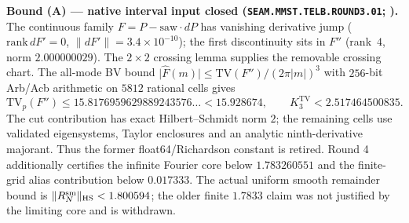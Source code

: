 \par\smallskip\noindent\textbf{Bound (A) --- native interval input closed
(\texttt{SEAM.MMST.TELB.ROUND3.01};
).}
The continuous family $F=P-\mathrm{saw}\cdot dP$ has vanishing derivative jump
($\mathrm{rank}\,dF'=0$, $\lVert dF'\rVert=3.4{\times}10^{-10}$); the first
discontinuity sits in $F''$ (rank~$4$, norm $2.000000029$).  The $2{\times}2$
crossing lemma supplies the removable crossing chart.  The all-mode BV bound
$\lvert\hat F(m)\rvert\le\mathrm{TV}(F'')/(2\pi\lvert m\rvert)^3$ with
$256$-bit Arb/Acb arithmetic on $5812$ rational cells gives
\[
 \mathrm{TV}_p(F'')\le15.8176959629889243576\ldots<15.928674,
 \qquad K_3^{\mathrm{TV}}<2.517464500835.
\]
The cut contribution has exact Hilbert--Schmidt norm $2$; the remaining cells use
validated eigensystems, Taylor enclosures and an analytic ninth-derivative majorant.
Thus the former float64/Richardson constant is retired. Round 4 additionally
certifies the infinite Fourier core below $1.783260551$ and the finite-grid
alias contribution below $0.017333$. The actual uniform smooth remainder
bound is $\|R_N^{\rm sm}\|_{\rm HS}<1.800594$; the older finite $1.7833$
claim was not justified by the limiting core and is withdrawn.

